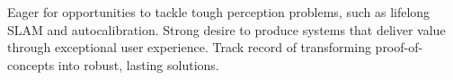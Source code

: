 

\begin{cvparagraph}

Eager for opportunities to tackle tough perception problems, such as lifelong
SLAM and autocalibration. Strong desire to produce systems that deliver
value through exceptional user experience. Track record of transforming
proof-of-concepts into robust, lasting solutions.
\end{cvparagraph}
